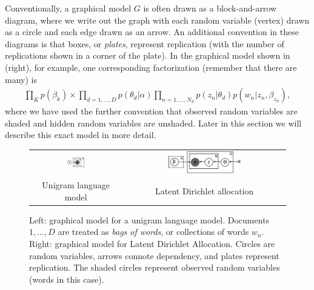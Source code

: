 Conventionally, a graphical model $G$ is often drawn as a
block-and-arrow diagram, where we write out the graph with each random
variable (vertex) drawn as a circle and each edge drawn as an
arrow.  An additional convention in these diagrams is that boxes, or
\emph{plates}, represent replication (with the number of replications
shown in a corner of the plate). In the graphical model shown in
 (right), for example, one corresponding
factorization (remember that there are many) is
\begin{align}
  \prod_K p(\beta_k) \times \prod_{d=1,\ldots,D} p(\theta_d | \alpha) \prod_{n=1,\ldots,N_d} p(z_n | \theta_d) p(w_n | z_n, \beta_{z_n}),
\end{align}
where we have used the further convention that observed random
variables are shaded and hidden random variables are unshaded.  Later
in this section we will describe this exact model in more detail.

\begin{figure}
  \begin{center}
    \begin{tabular}{cc}
      \includegraphics[width=0.2\textwidth]{chapter_introductory_material/figs/bagofwords_gm.pdf} & 
      \includegraphics[width=0.4667\textwidth]{chapter_introductory_material/figs/lda_gm.pdf} \\
      Unigram language model & Latent Dirichlet allocation \\
    \end{tabular}
  \end{center}
  \caption{Left: graphical model for a unigram language model.
    Documents $1, \ldots, D$ are treated as \emph{bags of words}, or
    collections of words $w_n$.  Right: graphical model for Latent
    Dirichlet Allocation.  Circles are random variables, arrows
    connote dependency, and plates represent replication.  The shaded
    circles represent observed random variables (words in this case).}
  \label{fig:bagofwords_lda_gm}
\end{figure}


